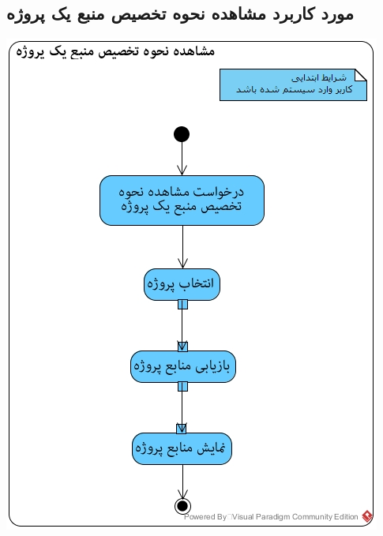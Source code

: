 \documentclass{article}
\begin{document}
\subsection*{مورد کاربرد مشاهده نحوه تخصیص منبع یک پروژه}
\vspace{2cm}
\begin{center}
\includegraphics[width=\textwidth]{ActivityDiagrams/38.jpg}
\end{center}

\newpage
\vspace{2cm}
\end{document}

